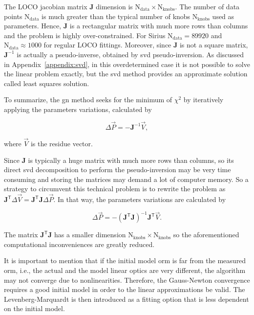 The LOCO jacobian matrix $\mathbf{J}$ dimension is $\mathrm{N}_{\mathrm{data}} \times \mathrm{N}_{\mathrm{knobs}}$. The number of data points $\mathrm{N}_{\mathrm{data}}$ is much greater than the typical number of knobs $\mathrm{N}_{\mathrm{knobs}}$ used as parameters. Hence, $\mathbf{J}$ is a rectangular matrix with much more rows than columns and the problem is highly over-constrained. For Sirius $\mathrm{N}_{\mathrm{data}} = 89920$ and $\mathrm{N}_{\mathrm{data}} \approx 1000$ for regular LOCO fittings. Moreover, since $\mathbf{J}$ is not a square matrix, $\mathbf{J}^{-1}$ is actually a pseudo-inverse, obtained by \gls{svd} pseudo-inversion. As discussed in Appendix~\ref{appendix:svd}, in this overdetermined case it is not possible to solve the linear problem exactly, but the \gls{svd} method provides an approximate solution called least squares solution.

To summarize, the \gls{gn} method seeks for the minimum of $\chi^2$ by iteratively applying the parameters variations, calculated by

\begin{equation}
    \Delta \vec{P} = - \mathbf{J}^{-1} \vec{V},
\end{equation}

where $\vec{V}$ is the residue vector.

Since $\mathbf{J}$ is typically a huge matrix with much more rows than columns, so its direct \gls{svd} decomposition to perform the pseudo-inversion may be very time consuming and storing the matrices may demand a lot of computer memory. So a strategy to 
circumvent this technical problem is to rewrite the problem as $\mathbf{J}^{\mathsf{T}}\Delta \vec{V} = \mathbf{J}^{\mathsf{T}}\mathbf{J}\Delta \vec{P}$. In that way, the parameters variations are calculated by

\begin{equation}
    \Delta \vec{P} = - \left(\mathbf{J}^{\mathsf{T}} \mathbf{J}\right)^{-1}\mathbf{J}^{\mathsf{T}} \vec{V}.
\end{equation}

The matrix $\mathbf{J}^{\mathsf{T}} \mathbf{J}$ has a smaller dimension $\mathrm{N}_{\mathrm{knobs}} \times \mathrm{N}_{\mathrm{knobs}}$ so the aforementioned computational 
inconveniences are greatly reduced.

It is important to mention that if the initial model \gls{orm} is far from the measured \gls{orm}, i.e., the actual and the model linear optics are very different, the algorithm may not converge due to nonlinearities. Therefore, the Gauss-Newton convergence requires a good initial model in order to the linear approximations be valid. The Levenberg-Marquardt is then introduced as a fitting option that is less dependent on the initial model.

